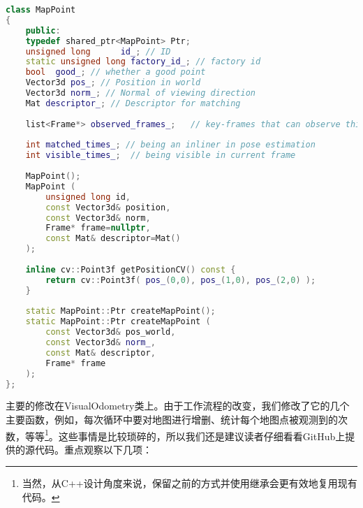\begin{lstlisting}[language=c++,caption=slambook/project/0.4/include/myslam/mappoint.h]
class MapPoint
{
	public:
	typedef shared_ptr<MapPoint> Ptr;
	unsigned long      id_; // ID
	static unsigned long factory_id_; // factory id
	bool  good_; // whether a good point 
	Vector3d pos_; // Position in world
	Vector3d norm_; // Normal of viewing direction 
	Mat descriptor_; // Descriptor for matching 
	
	list<Frame*> observed_frames_;   // key-frames that can observe this point 
	
	int matched_times_; // being an inliner in pose estimation
	int visible_times_;  // being visible in current frame 
	
	MapPoint();
	MapPoint ( 
		unsigned long id, 
		const Vector3d& position, 
		const Vector3d& norm, 
		Frame* frame=nullptr, 
		const Mat& descriptor=Mat() 
	);
	
	inline cv::Point3f getPositionCV() const {
		return cv::Point3f( pos_(0,0), pos_(1,0), pos_(2,0) );
	}
	
	static MapPoint::Ptr createMapPoint();
	static MapPoint::Ptr createMapPoint ( 
		const Vector3d& pos_world, 
		const Vector3d& norm_,
		const Mat& descriptor,
		Frame* frame 
	);
};
\end{lstlisting}

主要的修改在VisualOdometry类上。由于工作流程的改变，我们修改了它的几个主要函数，例如，每次循环中要对地图进行增删、统计每个地图点被观测到的次数，等等\footnote{当然，从C++设计角度来说，保留之前的方式并使用继承会更有效地复用现有代码。}。这些事情是比较琐碎的，所以我们还是建议读者仔细看看GitHub上提供的源代码。重点观察以下几项：

